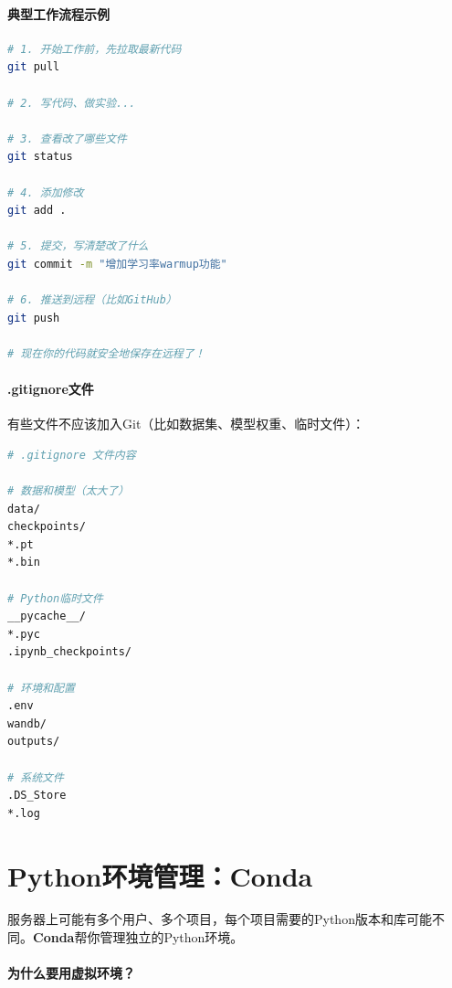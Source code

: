 \paragraph{典型工作流程示例}\mbox{}\par\nopagebreak

\begin{lstlisting}[language=bash, caption=一次完整的Git工作流程]
# 1. 开始工作前，先拉取最新代码
git pull

# 2. 写代码、做实验...

# 3. 查看改了哪些文件
git status

# 4. 添加修改
git add .

# 5. 提交，写清楚改了什么
git commit -m "增加学习率warmup功能"

# 6. 推送到远程（比如GitHub）
git push

# 现在你的代码就安全地保存在远程了！
\end{lstlisting}

\paragraph{.gitignore文件}

有些文件不应该加入Git（比如数据集、模型权重、临时文件）：

\begin{lstlisting}[language=bash, caption=.gitignore示例]
# .gitignore 文件内容

# 数据和模型（太大了）
data/
checkpoints/
*.pt
*.bin

# Python临时文件
__pycache__/
*.pyc
.ipynb_checkpoints/

# 环境和配置
.env
wandb/
outputs/

# 系统文件
.DS_Store
*.log
\end{lstlisting}

\section*{Python环境管理：Conda}

服务器上可能有多个用户、多个项目，每个项目需要的Python版本和库可能不同。\textbf{Conda}帮你管理独立的Python环境。

\paragraph{为什么要用虚拟环境？}

